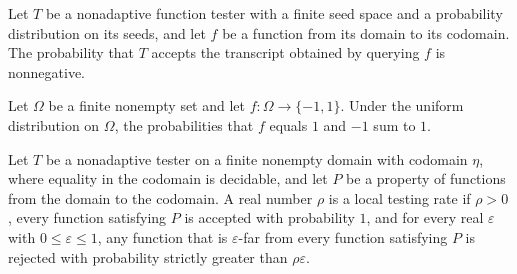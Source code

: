 \begin{theorem}
\label{FABL.NonadaptiveFunctionTester.acceptanceProbability_nonneg}
\leanok
{}
Let $T$ be a nonadaptive function tester with a finite seed space and a probability
distribution on its seeds, and let $f$ be a function from its domain to its codomain.
The probability that $T$ accepts the transcript obtained by querying $f$ is nonnegative.
\end{theorem}

\begin{theorem}
\label{FABL.uniformProbability_sign_eq_one_add_neg_one_eq_one}
\leanok
{}
Let $\Omega$ be a finite nonempty set and let $f\colon\Omega\to\{−1,1\}$. Under the
uniform distribution on $\Omega$, the probabilities that $f$ equals $1$ and $−1$ sum to
$1$.
\end{theorem}

\begin{definition}
\label{FABL.IsLocalTester}
\leanok
{}
Let $T$ be a nonadaptive tester on a finite nonempty domain with codomain $\eta$, where
equality in the codomain is decidable, and let $P$ be a property of functions from the
domain to the codomain. A real number $\rho$ is a local testing rate if $\rho>0$, every
function satisfying $P$ is accepted with probability $1$, and for every real
$\varepsilon$ with $0\leq\varepsilon\leq1$, any function that is $\varepsilon$-far from
every function satisfying $P$ is rejected with probability strictly greater than
$\rho\varepsilon$.
\end{definition}

